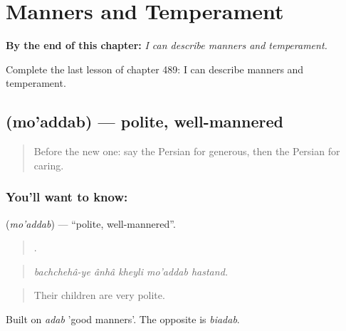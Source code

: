 
\chapter{Manners and Temperament}
\label{ch:fa-manners-and-temperament}

\begin{chapteropening}
\textbf{By the end of this chapter:} \emph{I can describe manners and temperament.}

Complete the last lesson of chapter 489: I can describe manners and temperament.
\end{chapteropening}

\section[\texorpdfstring{\fa{مودب} (mo'addab)}{مودب (mo'addab)}]{ (mo'addab) — polite, well-mannered}

\label{lesson:FA-C489-moaddab}



\begin{quote}
Before the new one: say the Persian for generous, then the Persian for caring.
\end{quote}

\subsection*{You'll want to know: }
\textbf{} (\emph{mo'addab}) — \textquotedblleft{}polite, well-mannered\textquotedblright{}.

\begin{quote}
     .
\end{quote}

\begin{quote}
\emph{bachchehâ-ye ânhâ kheyli mo'addab hastand.}
\end{quote}

\begin{quote}
Their children are very polite.
\end{quote}

Built on \emph{adab} 'good manners'. The opposite is \emph{biadab}.


